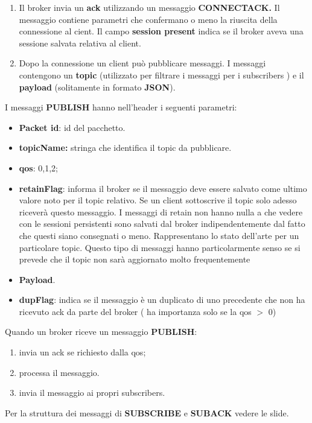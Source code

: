 \documentclass[12pt]{article}
\begin{document}
    			\begin{enumerate}
    				\item Il broker invia un \textbf{ack} utilizzando un messaggio \textbf{CONNECTACK.} Il messaggio contiene parametri che confermano o meno la riuscita della connessione al cient. Il campo \textbf{session present} indica se il broker aveva una sessione salvata relativa al client.
    				\item Dopo la connessione un client può pubblicare messaggi. I messaggi contengono un \textbf{topic } (utilizzato per filtrare i messaggi per i subscribers ) e il \textbf{payload} (solitamente in formato \textbf{JSON}).
    			\end{enumerate}
    			I messaggi \textbf{PUBLISH} hanno nell'header i seguenti parametri:
    			\begin{itemize}
    				\item \textbf{Packet id}: id del pacchetto.
    				\item \textbf{topicName:} stringa che identifica il topic da pubblicare.
    				\item \textbf{qos}: 0,1,2;
    				\item \textbf{retainFlag}: informa il broker se il messaggio deve essere salvato come ultimo valore noto per il topic relativo. Se un client sottoscrive il topic solo adesso riceverà questo messaggio. I messaggi di retain non hanno nulla a che vedere con le sessioni persistenti sono salvati dal broker indipendentemente dal fatto che questi siano consegnati o meno. Rappresentano lo stato dell'arte per un particolare topic. Questo tipo di messaggi hanno particolarmente senso se si prevede che il topic non sarà aggiornato molto frequentemente
    				\item \textbf{Payload}.
    				\item \textbf{dupFlag}: indica se il messaggio è un duplicato di uno precedente che non ha ricevuto ack da parte del broker ( ha importanza solo se la qos $>$ 0)
    			\end{itemize}
    			Quando un broker riceve un messaggio \textbf{PUBLISH}:
    			\begin{enumerate}
    				\item invia un ack se richiesto dalla qos;
    				\item processa il messaggio.
    				\item invia il messaggio ai propri subscribers.
    			\end{enumerate}
    			Per la struttura dei messaggi di \textbf{SUBSCRIBE} e \textbf{SUBACK} vedere le slide.\\
\end{document}
